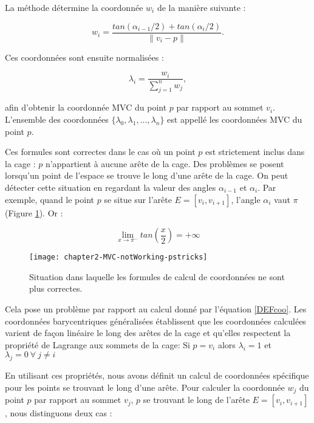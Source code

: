 La méthode détermine la coordonnée $w_i$ de la manière suivante :

\begin{equation}
  w_i = \frac{tan(\alpha_{i-1}/2) + tan(\alpha_i/2)}{\| v_i - p \|}.
  \label{DEFcoo}
\end{equation}

Ces coordonnées sont ensuite normalisées :

\begin{equation}
  \lambda_i = \frac{w_i}{\sum_{j=1}^n w_j},
\end{equation}

afin d'obtenir la coordonnée MVC du point $p$ par rapport au sommet $v_i$.
L'ensemble des coordonnées $\{\lambda_0, \lambda_1, ..., \lambda_n\}$ est
appellé les coordonnées MVC du point $p$.

Ces formules sont correctes dans le cas où un point $p$ est strictement inclus
dans la cage : $p$ n'appartient à aucune arête de la cage. Des problèmes se
posent lorsqu'un point de l'espace se trouve le long d'une arête de la cage.
On peut détecter cette situation en regardant la valeur des angles
$\alpha_{i-1}$ et $\alpha_i$. Par exemple, quand le point $p$ se situe sur
l'arête $E = [v_i,v_{i+1}]$, l'angle $\alpha_i$ vaut $\pi$ (Figure
\ref{DEFinc}). Or :

\begin{displaymath}
  \lim\limits_{x \to \pi^-} tan(\frac{x}{2}) = +\infty
\end{displaymath}

\begin{figure}[ht]
  \begin{center}
    \texttt{[image: chapter2-MVC-notWorking-pstricks]}

    \caption[Cas particulier MVC] {Situation dans laquelle les
formules de calcul de coordonnées ne sont plus correctes.}

    \label{DEFinc}
  \end{center}
\end{figure}

Cela pose un problème par rapport au calcul donné par l'équation \ref{DEFcoo}.
Les coordonnées barycentriques généralisées établissent que les coordonnées
calculées varient de façon linéaire le long des arêtes de la cage et qu'elles
respectent la propriété de Lagrange aux sommets de la cage: Si $p = v_i$ alors
$\lambda_i = 1$ et $\lambda_j = 0 ~\forall~ j \neq i$

En utilisant ces propriétés, nous avons définit un calcul de coordonnées
spécifique pour les points se trouvant le long d'une arête. Pour calculer la
coordonnée $w_j$ du point $p$ par rapport au sommet $v_j$, $p$ se trouvant le
long de l'arête $E = [v_i,v_{i+1}]$, nous distinguons deux cas :

